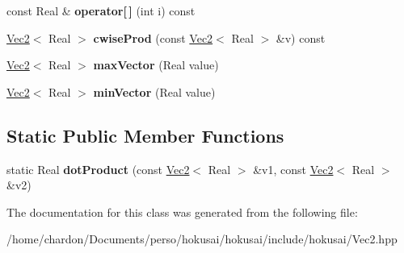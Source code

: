 \begin{DoxyCompactItemize}
\item 
\hypertarget{classVec2_a902876ad3778bb45888f106ab922a279}{const Real \& {\bfseries operator\mbox{[}$\,$\mbox{]}} (int i) const }\label{classVec2_a902876ad3778bb45888f106ab922a279}

\item 
\hypertarget{classVec2_aa31673ef165af88d4eb410a76bc4962c}{\hyperlink{classVec2}{Vec2}$<$ Real $>$ {\bfseries cwise\+Prod} (const \hyperlink{classVec2}{Vec2}$<$ Real $>$ \&v) const }\label{classVec2_aa31673ef165af88d4eb410a76bc4962c}

\item 
\hypertarget{classVec2_abbde730afaddfa915af08448ad71531e}{\hyperlink{classVec2}{Vec2}$<$ Real $>$ {\bfseries max\+Vector} (Real value)}\label{classVec2_abbde730afaddfa915af08448ad71531e}

\item 
\hypertarget{classVec2_af95ce68aead6725bc8268ea3668336c9}{\hyperlink{classVec2}{Vec2}$<$ Real $>$ {\bfseries min\+Vector} (Real value)}\label{classVec2_af95ce68aead6725bc8268ea3668336c9}

\end{DoxyCompactItemize}
\subsection*{Static Public Member Functions}
\begin{DoxyCompactItemize}
\item 
\hypertarget{classVec2_a683920377e4e3d3e2163d5b5826d27a9}{static Real {\bfseries dot\+Product} (const \hyperlink{classVec2}{Vec2}$<$ Real $>$ \&v1, const \hyperlink{classVec2}{Vec2}$<$ Real $>$ \&v2)}\label{classVec2_a683920377e4e3d3e2163d5b5826d27a9}

\end{DoxyCompactItemize}


The documentation for this class was generated from the following file\+:\begin{DoxyCompactItemize}
\item 
/home/chardon/\+Documents/perso/hokusai/hokusai/include/hokusai/Vec2.\+hpp\end{DoxyCompactItemize}
